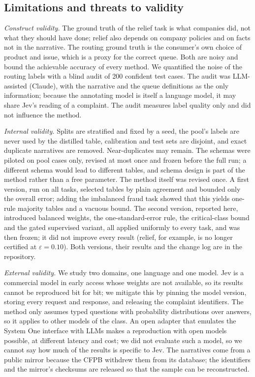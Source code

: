 \documentclass[a4paper,fleqn]{cas-sc}
\theoremstyle{definition}
\newcommand{\jev}{Jev}
\begin{document}
\subsection{Limitations and threats to validity}
\emph{Construct validity.} The ground truth of the relief task is what companies did, not what they should have done; relief also depends on company policies and on facts not in the narrative. The routing ground truth is the consumer's own choice of product and issue, which is a proxy for the correct queue. Both are noisy and bound the achievable accuracy of every method. We quantified the noise of the routing labels with a blind audit of 200 confident test cases. The audit was LLM-assisted (Claude), with the narrative and the queue definitions as the only information; because the annotating model is itself a language model, it may share \jev{}'s reading of a complaint. %
The audit measures label quality only and did not influence the method.

\emph{Internal validity.} Splits are stratified and fixed by a seed, the pool's labels are never used by the distilled table, calibration and test sets are disjoint, and exact duplicate narratives are removed. Near-duplicates may remain. The schemas were piloted on pool cases only, revised at most once and frozen before the full run; a different schema would lead to different tables, and schema design is part of the method rather than a free parameter. The method itself was revised once. A first version, run on all tasks, selected tables by plain agreement and bounded only the overall error; adding the imbalanced fraud task showed that this yields one-rule majority tables and a vacuous bound. The second version, reported here, introduced balanced weights, the one-standard-error rule, the critical-class bound and the gated supervised variant, all applied uniformly to every task, and was then frozen; it did not improve every result (relief, for example, is no longer certified at $\varepsilon=0.10$). Both versions, their results and the change log are in the repository.

\emph{External validity.} We study two domains, one language and one model. \jev{} is a commercial model in early access whose weights are not available, so its results cannot be reproduced bit for bit; we mitigate this by pinning the model version, storing every request and response, and releasing the complaint identifiers. The method only assumes typed questions with probability distributions over answers, so it applies to other models of the class. An open adapter that emulates the System One interface with LLMs \citep{systemoneadapter} makes a reproduction with open models possible, at different latency and cost; we did not evaluate such a model, so we cannot say how much of the results is specific to \jev{}. The narratives come from a public mirror because the CFPB withdrew them from its database; the identifiers and the mirror's checksums are released so that the sample can be reconstructed.
\end{document}

